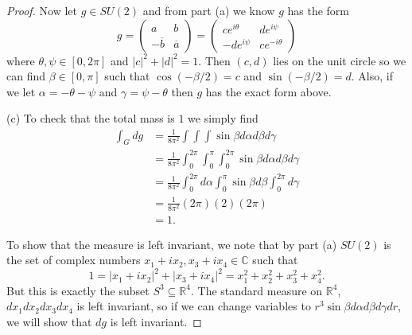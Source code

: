 \documentclass{article}
\begin{document}
\begin{proof}
Now let $g \in SU(2)$ and from part (a) we know $g$ has the form
\[
g
= \left ( \begin{array}{cc} a & b\\ -\overline{b} & \overline{a} \end{array} \right )
= \left ( \begin{array}{cc} ce^{i\theta} & de^{i\psi}\\ -de^{i\psi} & ce^{-i\theta} \end{array} \right )
\]
where $\theta,\psi \in [0,2 \pi]$ and $|c|^2 + |d|^2 = 1$. Then $(c,d)$ lies on the unit circle so we can find $\beta \in [0, \pi]$ such that $\cos(-\beta/2) = c$ and $\sin(-\beta/2) = d$. Also, if we let $\alpha = -\theta - \psi$ and $\gamma = \psi - \theta$ then $g$ has the exact form above.

(c) To check that the total mass is $1$ we simply find
\begin{align*}
\int_G dg
&= \frac{1}{8 \pi^2} \int \int \int \sin \beta d \alpha d \beta d \gamma\\
&= \frac{1}{8 \pi^2} \int_0^{2\pi} \int_0^{\pi} \int_0^{2 \pi} \sin \beta d \alpha d \beta d \gamma\\
&= \frac{1}{8 \pi^2} \int_0^{2 \pi} d \alpha \int_0^{\pi} \sin \beta d \beta \int_0^{2 \pi} d \gamma\\
&= \frac{1}{8 \pi^2} (2 \pi) (2) (2 \pi)\\
&= 1.
\end{align*}

To show that the measure is left invariant, we note that by part (a) $SU(2)$ is the set of complex numbers $x_1 + ix_2, x_3 + ix_4 \in \mathbb{C}$ such that
\[
1 = |x_1 + ix_2|^2 + |x_3 + ix_4|^2 = x_1^2 + x_2^2 + x_3^2 + x_4^2.
\]
But this is exactly the subset $S^3 \subseteq \mathbb{R}^4$. The standard measure on $\mathbb{R}^4$, $dx_1dx_2dx_3dx_4$ is left invariant, so if we can change variables to $r^3 \sin \beta d \alpha d \beta d \gamma d r$, we will show that $dg$ is left invariant.


\end{proof}
\end{document}

